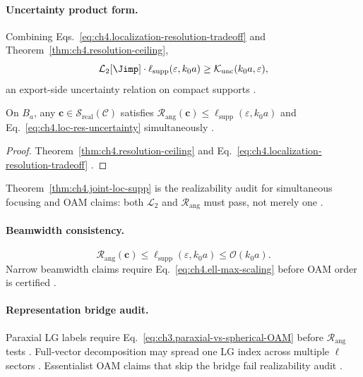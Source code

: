 \paragraph{Uncertainty product form.}
Combining Eqs.~\eqref{eq:ch4.localization-resolution-tradeoff} and Theorem~\ref{thm:ch4.resolution-ceiling},
\begin{equation}
\label{eq:ch4.loc-res-uncertainty}
\mathcal{L}_{2}[\Jimp]\cdot\ell_{\mathrm{supp}}(\varepsilon,k_{0}a)
\ge
\mathcal{K}_{\mathrm{unc}}(k_{0}a,\varepsilon),
\end{equation}
an export-side uncertainty relation on compact supports \cite{hansen1988,jackson1999,stratton1941,harrington2001,devaney2004}.

\begin{theorem}
\label{thm:ch4.joint-loc-supp}
On \(B_{a}\), any \(\mathbf{c}\in\mathcal{S}_{\mathrm{real}}(\mathcal{C})\) satisfies
\(\mathcal{R}_{\mathrm{ang}}(\mathbf{c})\le\ell_{\mathrm{supp}}(\varepsilon,k_{0}a)\) and Eq.~\eqref{eq:ch4.loc-res-uncertainty} simultaneously
\cite{hansen1988,stratton1941,harrington2001,devaney2004}.
\end{theorem}
\begin{proof}
Theorem~\ref{thm:ch4.resolution-ceiling} and Eq.~\eqref{eq:ch4.localization-resolution-tradeoff} \cite{hansen1988,stratton1941,jackson1999}.
\end{proof}

Theorem~\ref{thm:ch4.joint-loc-supp} is the realizability audit for simultaneous focusing and OAM claims: both \(\mathcal{L}_{2}\) and
\(\mathcal{R}_{\mathrm{ang}}\) must pass, not merely one \cite{harrington2001,hansen1988,devaney2004}.

\paragraph{Beamwidth consistency.}
\begin{equation}
\label{eq:ch4.beamwidth-ell-consistency}
\mathcal{R}_{\mathrm{ang}}(\mathbf{c})\le\ell_{\mathrm{supp}}(\varepsilon,k_{0}a)\le\mathcal{O}(k_{0}a).
\end{equation}
Narrow beamwidth claims require Eq.~\eqref{eq:ch4.ell-max-scaling} before OAM order is certified \cite{hansen1988,harrington2001,jackson1999}.

\paragraph{Representation bridge audit.}
Paraxial LG labels require Eq.~\eqref{eq:ch3.paraxial-vs-spherical-OAM} before \(\mathcal{R}_{\mathrm{ang}}\) tests \cite{harrington2001,allen1992}.
Full-vector decomposition may spread one LG index across multiple \(\ell\) sectors \cite{hansen1988,stratton1941,belinfante1940}. Essentialist OAM
claims that skip the bridge fail realizability audit \cite{devaney2004,harrington2001}.


